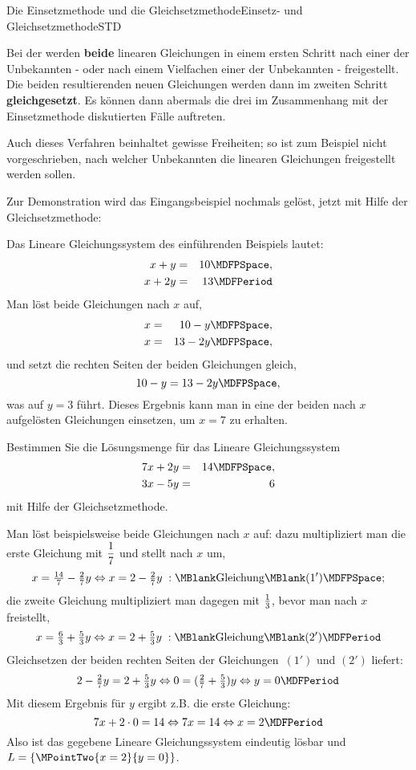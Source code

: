 \begin{MXContent}{Die Einsetzmethode und die Gleichsetzmethode}{Einsetz- und Gleichsetzmethode}{STD}
\begin{MInfo}
Bei der  werden \textbf{beide} linearen Gleichungen in einem ersten
Schritt nach einer der Unbekannten - oder nach einem Vielfachen einer der Unbekannten - freigestellt. Die beiden
resultierenden neuen Gleichungen werden dann im zweiten Schritt \textbf{gleichgesetzt}.
Es können dann abermals die drei im Zusammenhang mit der Einsetzmethode diskutierten Fälle auftreten.
\end{MInfo}
Auch dieses Verfahren beinhaltet gewisse Freiheiten; so ist zum Beispiel nicht vorgeschrieben, nach welcher Unbekannten
die linearen Gleichungen freigestellt werden sollen.

Zur Demonstration wird das Eingangsbeispiel nochmals gelöst, jetzt mit Hilfe der Gleichsetzmethode:
\begin{MExample}
Das Lineare Gleichungssystem des einführenden Beispiels lautet:
\begin{eqnarray*}
x + y & = & 10 \MDFPSpace, \\ x + 2 y & = & 13\MDFPeriod 
\end{eqnarray*}
Man löst beide Gleichungen nach $x$ auf,
\begin{eqnarray*}
x & = & 10 - y\MDFPSpace,  \\ x & = & 13 - 2y \MDFPSpace,
\end{eqnarray*}
und setzt die rechten Seiten der beiden Gleichungen gleich,
$$10 - y = 13 - 2y \MDFPSpace,$$
was auf $y = 3$ führt. Dieses Ergebnis kann man in eine der beiden nach $x$ aufgelösten Gleichungen einsetzen,
um $x = 7$ zu erhalten.
\end{MExample}
\begin{MExercise}
Bestimmen Sie die Lösungsmenge für das Lineare Gleichungssystem
\begin{eqnarray*}
7 x + 2 y &= & 14 \MDFPSpace, \\ 3 x - 5 y & = & 6
\end{eqnarray*}
mit Hilfe der Gleichsetzmethode.
\ \\
\begin{MHint}{\iSolution}
Man löst beispielsweise beide Gleichungen nach $x$ auf: dazu multipliziert man die erste Gleichung mit
$\dfrac{1}{7}$ und stellt nach $x$ um,
$$x = \Mtfrac{14}{7} - \Mtfrac27 y \Leftrightarrow x = 2 - \Mtfrac27 y \; : \MBlank\mbox{Gleichung}\MBlank (1') \MDFPSpace ;$$
die zweite Gleichung multipliziert man dagegen mit $\tfrac{1}{3}$, bevor man nach $x$ freistellt,
$$x = \Mtfrac63 + \Mtfrac53 y \Leftrightarrow x = 2 + \Mtfrac53 y \; : \MBlank\mbox{Gleichung}\MBlank (2') \MDFPeriod $$
Gleichsetzen der beiden rechten Seiten der Gleichungen~$(1')$ und $(2')$ liefert:
$$2 - \Mtfrac27 y = 2 + \Mtfrac53 y \Leftrightarrow 0 = (\Mtfrac27 + \Mtfrac53) y \Leftrightarrow y = 0 \MDFPeriod $$
Mit diesem Ergebnis für $y$ ergibt z.B. die erste Gleichung:
$$7 x + 2 \cdot 0 = 14 \Leftrightarrow 7 x = 14 \Leftrightarrow x = 2 \MDFPeriod $$
Also ist das gegebene Lineare Gleichungssystem eindeutig lösbar und ${\ML} = \{ \MPointTwo{x = 2}{y = 0} \}$.


\end{MHint}
\end{MExercise}
\end{MXContent}

